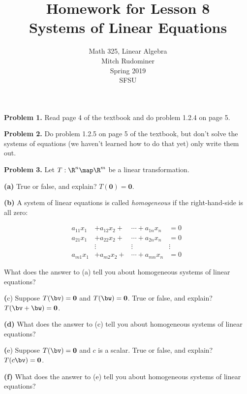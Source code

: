 \documentclass[oneside,12pt]{amsart}
\begin{document}
\title{Homework for Lesson 8 \\ Systems of Linear Equations}
\author{Math 325, Linear Algebra \\ Mitch Rudominer \\ Spring 2019 \\ SFSU }
\date{}

\maketitle

\textbf{Problem 1.} Read page 4 of the textbook and do problem 1.2.4 on
page 5.

\bigskip
\bigskip
\bigskip
\bigskip
\bigskip
\bigskip
\bigskip
\bigskip
\bigskip
\bigskip

\textbf{Problem 2.} Do problem 1.2.5 on page 5 of the textbook, but don't
solve the systems of equations (we haven't learned how to do that yet)
only write them out.

\bigskip
\bigskip
\bigskip
\bigskip
\bigskip
\bigskip
\bigskip
\bigskip
\bigskip
\bigskip

\textbf{Problem 3.} Let $T:\R^n\map\R^m$ be a linear transformation.

\textbf{(a)} True or false, and explain? $T(\mathbf{0}) = \mathbf{0}$.

\bigskip

\textbf{(b)} A system of linear equations is called \emph{homogeneous} if the
right-hand-side is all zero:

\begin{align*}
 a_{11}x_1 &+ a_{12}x_2 + &\cdots + a_{1n} x_n &= 0\\
 a_{21}x_1 &+ a_{22}x_2 + &\cdots + a_{2n} x_n &= 0\\
 \quad &{ \vdots \quad} \quad &{ \vdots \quad} \quad  &{ \vdots \quad} \quad\\
 a_{m1}x_1 &+ a_{m2}x_2 + &\cdots + a_{mn} x_n &= 0
\end{align*}

What does the answer to (a) tell you about homogeneous systems of linear equations?

\bigskip

\textbf(c) Suppose $T(\bv) = \mathbf{0}$ and $T(\bw) = \mathbf{0}$.
True or false, and explain? $T(\bv + \bw) = \mathbf{0}$.

\bigskip

\textbf{(d)} What does the answer to (c) tell you about homogeneous systems of linear equations?

\bigskip

\textbf(e) Suppose $T(\bv) = \mathbf{0}$ and $c$ is a scalar.
True or false, and explain? $T(c\bv) = \mathbf{0}$.

\bigskip

\textbf{(f)} What does the answer to (e) tell you about homogeneous systems of linear equations?
\end{document}
